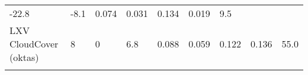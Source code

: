 \documentclass[11pt]{article}
\begin{document}
\begin{longtable}[]{@{}lllllllll@{}}
\begin{minipage}[t]{0.06\columnwidth}
-22.8\strut
\end{minipage} & \begin{minipage}[t]{0.08\columnwidth}\raggedright\strut
-8.1\strut
\end{minipage} & \begin{minipage}[t]{0.05\columnwidth}\raggedright\strut
0.074\strut
\end{minipage} & \begin{minipage}[t]{0.07\columnwidth}\raggedright\strut
0.031\strut
\end{minipage} & \begin{minipage}[t]{0.06\columnwidth}\raggedright\strut
0.134\strut
\end{minipage} & \begin{minipage}[t]{0.06\columnwidth}\raggedright\strut
0.019\strut
\end{minipage} & \begin{minipage}[t]{0.07\columnwidth}\raggedright\strut
9.5\strut
\end{minipage}\tabularnewline
\begin{minipage}[t]{0.25\columnwidth}\raggedright\strut
LXV CloudCover (oktas)\strut
\end{minipage} & \begin{minipage}[t]{0.06\columnwidth}\raggedright\strut
8\strut
\end{minipage} & \begin{minipage}[t]{0.06\columnwidth}\raggedright\strut
0\strut
\end{minipage} & \begin{minipage}[t]{0.08\columnwidth}\raggedright\strut
6.8\strut
\end{minipage} & \begin{minipage}[t]{0.05\columnwidth}\raggedright\strut
0.088\strut
\end{minipage} & \begin{minipage}[t]{0.07\columnwidth}\raggedright\strut
0.059\strut
\end{minipage} & \begin{minipage}[t]{0.06\columnwidth}\raggedright\strut
0.122\strut
\end{minipage} & \begin{minipage}[t]{0.06\columnwidth}\raggedright\strut
0.136\strut
\end{minipage} & \begin{minipage}[t]{0.07\columnwidth}\raggedright\strut
55.0\strut
\end{minipage}\tabularnewline
\begin{minipage}[t]{0.25\columnwidth}\raggedright\strut

\end{minipage}
\end{longtable}
\end{document}
